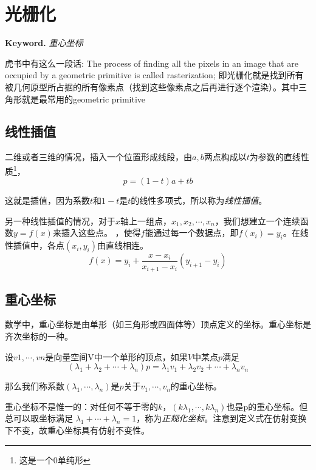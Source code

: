 \chapter{光栅化}

\textbf{Keyword. } \textsl{重心坐标}

\hspace*{1em}

虎书中有这么一段话: The process of finding all the pixels in an image that are occupied by a geometric primitive is called rasterization; 即光栅化就是找到所有被几何原型所占据的所有像素点（找到这些像素点之后再进行逐个渲染）。其中三角形就是最常用的geometric primitive

\section{线性插值}

二维或者三维的情况，插入一个位置形成线段，由$a,b$两点构成以$t$为参数的直线性质\footnote{这是一个0单纯形}，
\begin{equation}
    p=(1-t)a+tb
\end{equation}

这就是插值，因为系数$t$和$1-t$是$t$的线性多项式，所以称为\textsl{线性插值}。

另一种线性插值的情况，对于$x$轴上一组点，$x_1,x_2,\cdots,x_n$，我们想建立一个连续函数$y=f(x)$来插入这些点。
，使得$f$能通过每一个数据点，即$f(x_i)=y_i$。在线性插值中，各点$(x_i,y_i)$由直线相连。
\begin{equation}
    f(x)=y_i+\frac{x-x_i}{x_{i+1}-x_i}(y_{i+1}-y_i)
\end{equation}

\section{重心坐标}

数学中，重心坐标是由单形（如三角形或四面体等）顶点定义的坐标。重心坐标是齐次坐标的一种。

设$v1,\cdots,vn$是向量空间V中一个单形的顶点，如果$V$中某点$p$满足
\begin{equation}
    (\lambda_1+\lambda_2+\cdots+\lambda_n)p=\lambda_1v_1+\lambda_2v_2+\cdots+\lambda_nv_n
\end{equation}

那么我们称系数$(\lambda_1,\cdots, \lambda_n)$是$ p$关于$v_1,\cdots,v_n$的重心坐标。

重心坐标不是惟一的：对任何不等于零的$k$，$(k\lambda_1,\cdots, k\lambda_n)$也是p的重心坐标。但总可以取坐标满足 $\lambda_1+\cdots+\lambda_n = 1$，称为\textsl{正规化坐标}。注意到定义式在仿射变换下不变，故重心坐标具有仿射不变性。 

